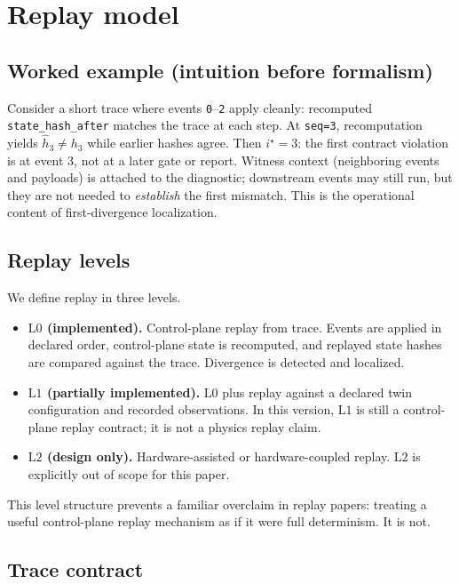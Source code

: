 \documentclass[11pt]{article}
\newcommand{\field}[1]{\texttt{#1}}
\newcommand{\Lzero}{\ensuremath{\mathrm{L0}}}
\newcommand{\Lone}{\ensuremath{\mathrm{L1}}}
\newcommand{\Ltwo}{\ensuremath{\mathrm{L2}}}
\begin{document}
\section{Replay model}

\subsection{Worked example (intuition before formalism)}
Consider a short trace where events \texttt{0}--\texttt{2} apply cleanly: recomputed \field{state\_hash\_after} matches the trace at each step. At \texttt{seq=3}, recomputation yields $\hat{h}_3 \neq h_3$ while earlier hashes agree. Then $i^\star=3$: the first contract violation is at event 3, not at a later gate or report. Witness context (neighboring events and payloads) is attached to the diagnostic; downstream events may still run, but they are not needed to \emph{establish} the first mismatch. This is the operational content of first-divergence localization.

\subsection{Replay levels}

We define replay in three levels.

\begin{itemize}[leftmargin=1.5em]
    \item \textbf{\Lzero{} (implemented).} Control-plane replay from trace. Events are applied in declared order, control-plane state is recomputed, and replayed state hashes are compared against the trace. Divergence is detected and localized.
    \item \textbf{\Lone{} (partially implemented).} \Lzero{} plus replay against a declared twin configuration and recorded observations. In this version, \Lone{} is still a control-plane replay contract; it is not a physics replay claim.
    \item \textbf{\Ltwo{} (design only).} Hardware-assisted or hardware-coupled replay. \Ltwo{} is explicitly out of scope for this paper.
\end{itemize}

This level structure prevents a familiar overclaim in replay papers: treating a useful control-plane replay mechanism as if it were full determinism. It is not.

\subsection{Trace contract}
\end{document}
